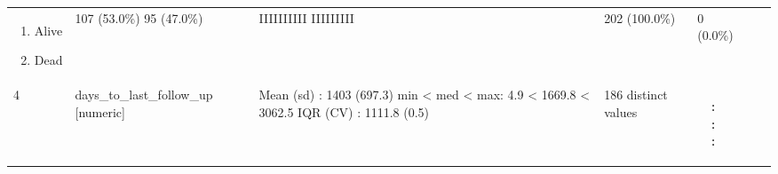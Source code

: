\documentclass[
]{article}
\providecommand{\tightlist}{%
  \setlength{\itemsep}{0pt}\setlength{\parskip}{0pt}}
\begin{document}
\begin{longtable}[]{@{}lllllll@{}}
\begin{minipage}[t]{0.20\columnwidth}
\begin{enumerate}
\def\labelenumi{\arabic{enumi}.}
\tightlist
\item
  Alive
\item
  Dead
\end{enumerate}\strut
\end{minipage} & \begin{minipage}[t]{0.14\columnwidth}\raggedright
107 (53.0\%)
95 (47.0\%)\strut
\end{minipage} & \begin{minipage}[t]{0.14\columnwidth}\raggedright
IIIIIIIIII
IIIIIIIII\strut
\end{minipage} & \begin{minipage}[t]{0.07\columnwidth}\raggedright
202
(100.0\%)\strut
\end{minipage} & \begin{minipage}[t]{0.07\columnwidth}\raggedright
0
(0.0\%)\strut
\end{minipage}\tabularnewline
\begin{minipage}[t]{0.03\columnwidth}\raggedright
4\strut
\end{minipage} & \begin{minipage}[t]{0.16\columnwidth}\raggedright
days\_to\_last\_follow\_up
{[}numeric{]}\strut
\end{minipage} & \begin{minipage}[t]{0.20\columnwidth}\raggedright
Mean (sd) : 1403 (697.3)
min \textless{} med \textless{} max:
4.9 \textless{} 1669.8 \textless{} 3062.5
IQR (CV) : 1111.8 (0.5)\strut
\end{minipage} & \begin{minipage}[t]{0.14\columnwidth}\raggedright
186 distinct values\strut
\end{minipage} & \begin{minipage}[t]{0.14\columnwidth}\raggedright
\begin{verbatim}
  :
  :
  :
\end{verbatim}


\end{minipage}
\end{longtable}
\end{document}
